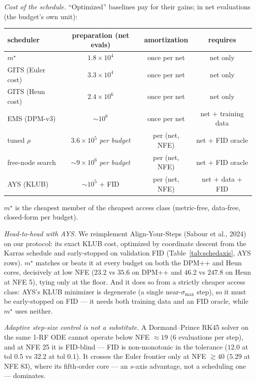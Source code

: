 \documentclass[11pt]{article}
\begin{document}
\smallskip
\noindent\emph{Cost of the schedule.} ``Optimized'' baselines pay for their
gains; in net evaluations (the budget's own unit):

\begin{center}\footnotesize
\begin{tabular}{lccc}
\toprule
scheduler & preparation (net evals) & amortization & requires\\
\midrule
$m^\star$            & $1.8{\times}10^{4}$ & once per net & net only\\
GITS (Euler cost)    & $3.3{\times}10^{4}$ & once per net & net only\\
GITS (Heun cost)     & $2.4{\times}10^{6}$ & once per net & net only\\
EMS (DPM-v3)         & $\sim\!10^{6}$ & once per net & net $+$ training data\\
tuned $\rho$         & $3.6{\times}10^{5}$ \emph{per budget} & per (net, NFE) & net $+$ FID oracle\\
free-node search     & $\sim\!9{\times}10^{6}$ \emph{per budget} & per (net, NFE) & net $+$ FID oracle\\
AYS (KLUB)           & $\sim\!10^{5}$ $+$ FID & per (net, NFE) & net $+$ data $+$ FID\\
\bottomrule
\end{tabular}
\end{center}

\noindent $m^\star$ is the cheapest member of the cheapest access class
(metric-free, data-free, closed-form per budget).

\emph{Head-to-head with AYS.} We reimplement Align-Your-Steps (Sabour et al.,
2024) on our protocol: its exact KLUB cost, optimized by coordinate descent
from the Karras schedule and early-stopped on validation FID
(Table~\ref{tab:schedaxis}, AYS rows). $m^\star$ matches or beats it at every
budget on both the DPM++ and Heun cores, decisively at low NFE ($23.2$ vs
$35.6$ on DPM++ and $46.2$ vs $247.8$ on Heun at NFE 5), tying only at the
floor. And it does so from a strictly cheaper access class: AYS's KLUB
minimizer is degenerate (a single near-$\sigma_{\max}$ step), so it must be
early-stopped on FID --- it needs both training data and an FID oracle, while
$m^\star$ uses neither.

\emph{Adaptive step-size control is not a substitute.} A Dormand--Prince RK45
solver on the same 1-RF ODE cannot operate below NFE ${\approx}19$ (6
evaluations per step), and at NFE 25 it is FID-blind --- FID is non-monotonic
in the tolerance ($12.0$ at tol $0.5$ vs $32.2$ at tol $0.1$). It crosses the
Euler frontier only at NFE ${\gtrsim}40$ ($5.29$ at NFE 83), where its
fifth-order core --- an $s$-axis advantage, not a scheduling one ---
dominates.
\end{document}
